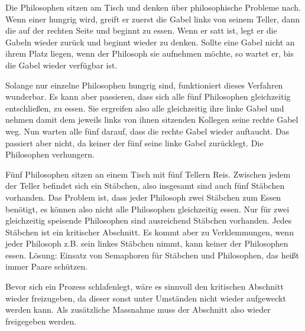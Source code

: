 \begin{answer}
Die Philosophen sitzen am Tisch und denken über philosophische Probleme nach. Wenn einer hungrig wird, greift er zuerst die Gabel links von seinem Teller, dann die auf der rechten Seite und beginnt zu essen. Wenn er satt ist, legt er die Gabeln wieder zurück und beginnt wieder zu denken. Sollte eine Gabel nicht an ihrem Platz liegen, wenn der Philosoph sie aufnehmen möchte, so wartet er, bis die Gabel wieder verfügbar ist.

Solange nur einzelne Philosophen hungrig sind, funktioniert dieses Verfahren wunderbar. Es kann aber passieren, dass sich alle fünf Philosophen gleichzeitig entschließen, zu essen. Sie ergreifen also alle gleichzeitig ihre linke Gabel und nehmen damit dem jeweils links von ihnen sitzenden Kollegen seine rechte Gabel weg. Nun warten alle fünf darauf, dass die rechte Gabel wieder auftaucht. Das passiert aber nicht, da keiner der fünf seine linke Gabel zurücklegt. Die Philosophen verhungern.
\end{answer}

\begin{answer}
Fünf Philosophen sitzen an einem Tisch mit fünf Tellern Reis. Zwischen jedem der Teller befindet
sich ein Stäbchen, also insgesamt sind auch fünf Stäbchen vorhanden. Das Problem ist, dass jeder
Philosoph zwei Stäbchen zum Essen benötigt, es können also nicht alle Philosophen gleichzeitig
essen. Nur für zwei gleichzeitig speisende Philosophen sind ausreichend Stäbchen vorhanden.
Jedes Stäbchen ist ein kritischer Abschnitt. Es kommt aber zu Verklemmungen, wenn jeder Philosoph
z.B. sein linkes Stäbchen nimmt, kann keiner der Philosophen essen.
Lösung: Einsatz von Semaphoren für Stäbchen und Philosophen, das heißt immer Paare schützen.
\end{answer}

\begin{answer}
Bevor sich ein Prozess schlafenlegt, wäre es sinnvoll den kritischen Abschnitt wieder freizugeben,
da dieser sonst unter Umständen nicht wieder aufgeweckt werden kann. Als zusätzliche Massnahme
muss der Abschnitt also wieder freigegeben werden.
\end{answer}

